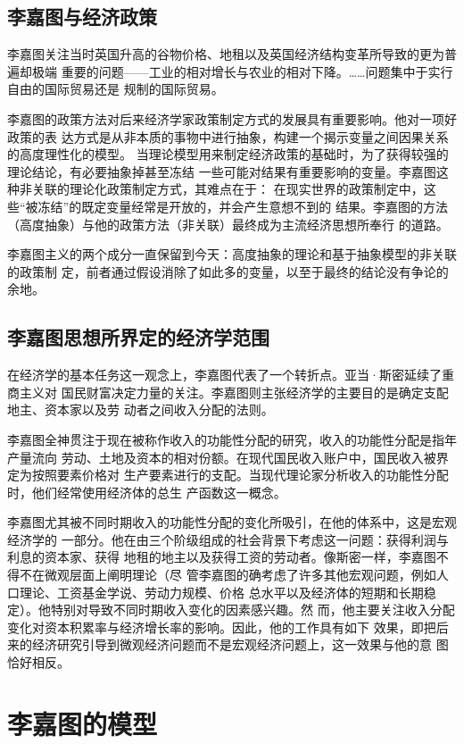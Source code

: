 \subsection{李嘉图与经济政策}

李嘉图关注当时英国升高的谷物价格、地租以及英国经济结构变革所导致的更为普遍却极端
重要的问题——工业的相对增长与农业的相对下降。……问题集中于实行自由的国际贸易还是
规制的国际贸易。

李嘉图的政策方法对后来经济学家政策制定方式的发展具有重要影响。他对一项好政策的表
达方式是从非本质的事物中进行抽象，构建一个揭示变量之间因果关系的高度理性化的模型。
当理论模型用来制定经济政策的基础时，为了获得较强的理论结论，有必要抽象掉甚至冻结
一些可能对结果有重要影响的变量。李嘉图这种非关联的理论化政策制定方式，其难点在于：
在现实世界的政策制定中，这些“被冻结”的既定变量经常是开放的，并会产生意想不到的
结果。李嘉图的方法（高度抽象）与他的政策方法（非关联）最终成为主流经济思想所奉行
的道路。

李嘉图主义的两个成分一直保留到今天：高度抽象的理论和基于抽象模型的非关联的政策制
定，前者通过假设消除了如此多的变量，以至于最终的结论没有争论的余地。

\subsection{李嘉图思想所界定的经济学范围}

在经济学的基本任务这一观念上，李嘉图代表了一个转折点。亚当·斯密延续了重商主义对
国民财富决定力量的关注。李嘉图则主张经济学的主要目的是确定支配地主、资本家以及劳
动者之间收入分配的法则。

李嘉图全神贯注于现在被称作收入的功能性分配的研究，收入的功能性分配是指年产量流向
劳动、土地及资本的相对份额。在现代国民收入账户中，国民收入被界定为按照要素价格对
生产要素进行的支配。当现代理论家分析收入的功能性分配时，他们经常使用经济体的总生
产函数这一概念。

李嘉图尤其被不同时期收入的功能性分配的变化所吸引，在他的体系中，这是宏观经济学的
一部分。他在由三个阶级组成的社会背景下考虑这一问题：获得利润与利息的资本家、获得
地租的地主以及获得工资的劳动者。像斯密一样，李嘉图不得不在微观层面上阐明理论（尽
管李嘉图的确考虑了许多其他宏观问题，例如人口理论、工资基金学说、劳动力规模、价格
总水平以及经济体的短期和长期稳定）。他特别对导致不同时期收入变化的因素感兴趣。然
而，他主要关注收入分配变化对资本积累率与经济增长率的影响。因此，他的工作具有如下
效果，即把后来的经济研究引导到微观经济问题而不是宏观经济问题上，这一效果与他的意
图恰好相反。

\section{李嘉图的模型}

